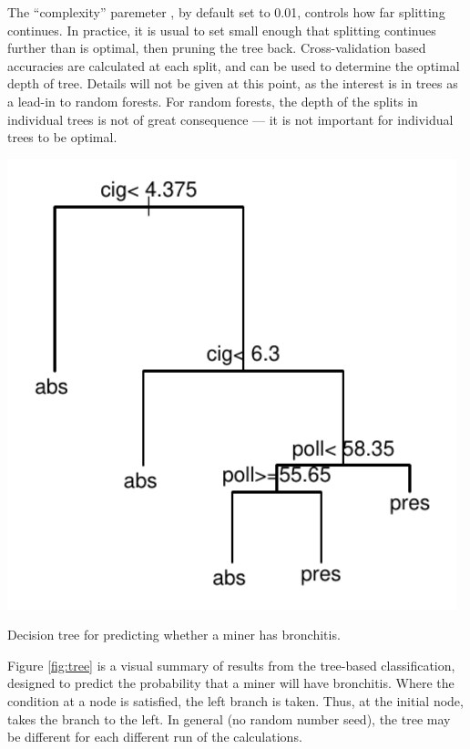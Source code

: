 The ``complexity'' paremeter , by default set to 0.01,
controls how far splitting continues.  In practice, it is usual to
set  small enough that splitting continues further than
is optimal, then pruning the tree back. Cross-validation based
accuracies are calculated at each split, and can be used to determine
the optimal depth of tree.  Details will not be given at this point,
as the interest is in trees as a lead-in to random forests.  For
random forests, the depth of the splits in individual trees is not
of great consequence --- it is not important for individual trees
to be optimal.

\begin{marginfigure}
\begin{Schunk}


\centerline{\includegraphics[width=0.98\textwidth]{figs/12-treefig-1} }

\end{Schunk}
\caption{Decision tree for predicting whether a miner has
    bronchitis.
}\label{fig:tree}
\end{marginfigure}

Figure \ref{fig:tree} is a visual summary of results from the
tree-based classification, designed to predict the probability that a
miner will have bronchitis.  Where the condition at a node is
satisfied, the left branch is taken. Thus, at the initial node,
 takes the branch to the left.  In general (no
random number seed), the tree may be different for each
different run of the calculations.

